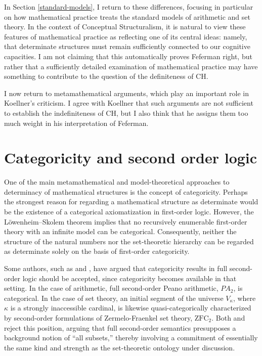 \documentclass[11pt,a4paper]{book}
\theoremstyle{plain}
\begin{document}
In Section \ref{standard-models}, I return to these differences, focusing in particular on how mathematical practice treats the standard models of arithmetic and set theory. In the context of Conceptual Structuralism, it is natural to view these features of mathematical practice as reflecting one of its central ideas: namely, that determinate structures must remain sufficiently connected to our cognitive capacities. I am not claiming that this automatically proves Feferman right, but rather that a sufficiently detailed examination of mathematical practice may have something to contribute to the question of the definiteness of CH.

I now return to metamathematical arguments, which play an important role in Koellner's criticism. I agree with Koellner that such arguments are not sufficient to establish the indefiniteness of CH, but I also think that he assigns them too much weight in his interpretation of Feferman.


\section{Categoricity and second order logic}
\label{categoricity-second-order-logic}

One of the main metamathematical and model-theoretical approaches to determinacy of mathematical structures is the concept of categoricity. Perhaps the strongest reason for regarding a mathematical structure as determinate would be the existence of a categorical axiomatization in first-order logic. However, the Löwenheim--Skolem theorem implies that no recursively enumerable first-order theory with an infinite model can be categorical. Consequently, neither the structure of the natural numbers nor the set-theoretic hierarchy can be regarded as determinate solely on the basis of first-order categoricity.

Some authors, such as \textcite[31]{Isaacson2008} and \textcite[chapter 8]{shapiro1991foundations}, have argued that categoricity results in full second-order logic should be accepted, since categoricity becomes available in that setting. In the case of arithmetic, full second-order Peano arithmetic, $PA_2$, is categorical. In the case of set theory, an initial segment of the universe $V_\kappa$, where $\kappa$ is a strongly inaccessible cardinal, is likewise quasi-categorically characterized by second-order formulations of Zermelo-Fraenkel set theory, $\mathrm{ZFC}_2$. Both \textcite[19]{Feferman2011a} and \textcite[511]{Koellner2016} reject this position, arguing that full second-order semantics presupposes a background notion of ``all subsets,'' thereby involving a commitment of essentially the same kind and strength as the set-theoretic ontology under discussion. 
\end{document}
